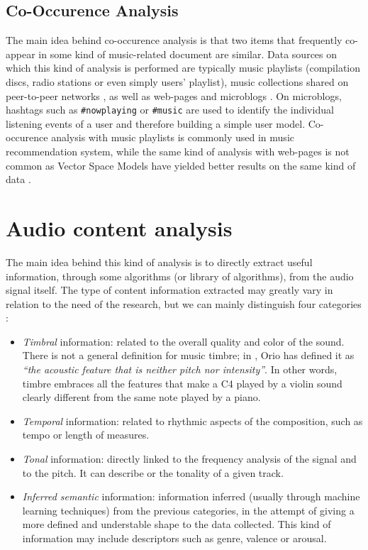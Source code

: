 \subsection{Co-Occurence Analysis}
The main idea behind co-occurence analysis is that two items that frequently co-appear in some kind of music-related document are similar. Data sources on which this kind of analysis is performed are typically music playlists \cite{pachet01} (compilation discs, radio stations or even simply users' playlist), music collections shared on peer-to-peer networks \cite{whitman02}, as well as web-pages \cite{zadel04} \cite{cohen00} and microblogs \cite{schedlmicro} \cite{zangerle12}. On microblogs, hashtags such as \texttt{#nowplaying} or \texttt{#music} are used to identify the individual listening events of a user and therefore building a simple user model. Co-occurence analysis with music playlists is commonly used in music recommendation system, while the same kind of analysis with web-pages is not common as Vector Space Models have yielded better results on the same kind of data \cite{schedlpohle}.

\section{Audio content analysis}
The main idea behind this kind of analysis is to directly extract useful information, through some algorithms (or library of algorithms), from the audio signal itself. The type of content information extracted may greatly vary in relation to the need of the research, but we can mainly distinguish four categories \cite{bogdanov13}:
\begin{itemize}
\item \textit{Timbral} information: related to the overall quality and color of the sound. There is not a general definition for music timbre; in \cite{orio06}, Orio has defined it as \textit{``the acoustic feature that is neither pitch nor intensity''}. In other words, timbre embraces all the features that make a C4 played by a violin sound clearly different from the same note played by a piano.
\item \textit{Temporal} information: related to rhythmic aspects of the composition, such as tempo or length of measures.
\item \textit{Tonal} information: directly linked to the frequency analysis of the signal and to the pitch. It can describe  or the tonality of a given track.
\item \textit{Inferred semantic} information: information inferred (usually through machine learning techniques) from the previous categories, in the attempt of giving a more defined and understable shape to the data collected. This kind of information may include descriptors such as genre, valence or arousal.
\end{itemize}

